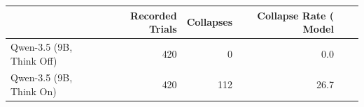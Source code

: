 \begin{tabular}{lrrr}
\toprule
 & Recorded Trials & Collapses & Collapse Rate (%
Model &  &  &  \\
\midrule
Qwen-3.5 (9B, Think Off) & 420 & 0 & 0.0 \\
Qwen-3.5 (9B, Think On) & 420 & 112 & 26.7 \\
\bottomrule
\end{tabular}
